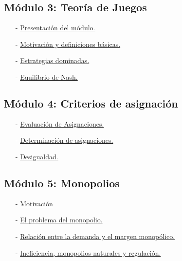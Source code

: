 \subsection*{Módulo 3: Teoría de Juegos}

\begin{itemize}
    \item[-] \href{https://www.youtube.com/watch?v=2B01O0VaJg4}{Presentación del módulo.}
    
    \item[-] \href{https://www.youtube.com/watch?v=Dh2AqD6h9nI}{Motivación y definiciones básicas.}
    
    \item[-] \href{https://www.youtube.com/watch?v=fKQ_5sbB9pI}{Estrategias dominadas.}
    
    \item[-] \href{https://youtu.be/S5mZmz6Q3PE}{Equilibrio de Nash.}
    
\end{itemize}

\subsection*{Módulo 4: Criterios de asignación}

\begin{itemize}
    \item[-] \href{https://youtu.be/VmjpxTykH5s}{Evaluación de Asignaciones.}
    
    \item[-] \href{https://youtu.be/jWcbHlTCPnQ}{Determinación de asignaciones.}
    
    \item[-] \href{https://youtu.be/PnxKqsnTKOM}{Desigualdad.}
    
\end{itemize}

\subsection*{Módulo 5: Monopolios}

\begin{itemize}
    \item[-] \href{https://youtu.be/WADyP3bQrH4}{Motivación}
    
    \item[-] \href{https://youtu.be/5jgzGaegmcY}{El problema del monopolio.}
    
    \item[-] \href{https://youtu.be/aORZTXIdOHw}{Relación entre la demanda y el margen monopólico.}
    
    \item[-] \href{https://youtu.be/VMXx_u8HF00}{Ineficiencia, monopolios naturales y regulación.}
    
\end{itemize}


